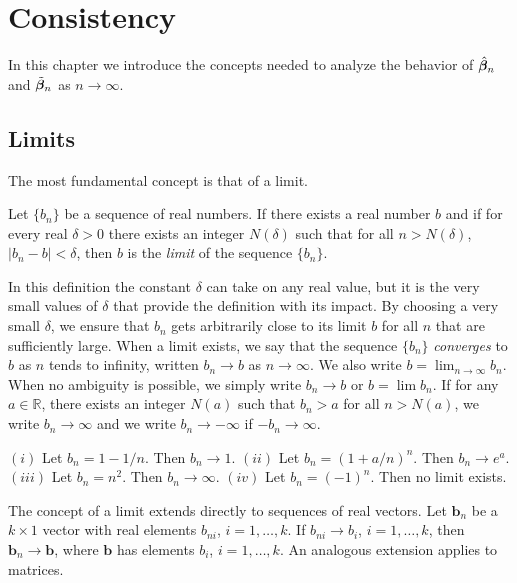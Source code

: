 \chapter{Consistency}\label{ch:consistency}

In this chapter we introduce the concepts needed to analyze the behavior
of $\hat{\boldsymbol{\beta}}_n$ and $\tilde{\boldsymbol{\beta}}_n$ as $n \to \infty$.

\section{Limits}\label{sec:limits}

The most fundamental concept is that of a limit.

\begin{definition}\label{def:limit}
Let $\{b_n\}$ be a sequence of real numbers. If there exists a
real number $b$ and if for every real $\delta > 0$ there exists an integer $N(\delta)$ such
that for all $n > N(\delta)$, $|b_n - b| < \delta$, then $b$ is the \emph{limit} of the sequence $\{b_n\}$.
\end{definition}

In this definition the constant $\delta$ can take on any real value, but it is
the very small values of $\delta$ that provide the definition with its impact. By
choosing a very small $\delta$, we ensure that $b_n$ gets arbitrarily close to its limit
$b$ for all $n$ that are sufficiently large. When a limit exists, we say that the
sequence $\{b_n\}$ \emph{converges} to $b$ as $n$ tends to infinity, written $b_n \to b$ as
$n \to \infty$. We also write $b = \lim_{n\to\infty} b_n$. When no ambiguity is possible, we
simply write $b_n \to b$ or $b = \lim b_n$. If for any $a \in \mathbb{R}$, there exists an integer
$N(a)$ such that $b_n > a$ for all $n > N(a)$, we write $b_n \to \infty$ and we write
$b_n \to -\infty$ if $-b_n \to \infty$.

\begin{example}\label{ex:limits}
$(i)$ Let $b_n = 1 - 1/n$. Then $b_n \to 1$. $(ii)$ Let $b_n = (1+a/n)^n$.
Then $b_n \to e^a$. $(iii)$ Let $b_n = n^2$. Then $b_n \to \infty$. $(iv)$ Let $b_n = (-1)^n$. Then
no limit exists.
\end{example}

The concept of a limit extends directly to sequences of real vectors. Let
$\mathbf{b}_n$ be a $k \times 1$ vector with real elements $b_{ni}$, $i = 1, \ldots, k$. If $b_{ni} \to b_i$,
$i = 1, \ldots, k$, then $\mathbf{b}_n \to \mathbf{b}$, where $\mathbf{b}$ has elements $b_i$, $i = 1, \ldots, k$. An
analogous extension applies to matrices.

